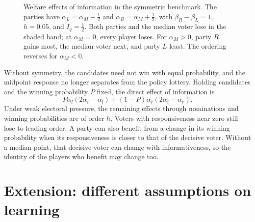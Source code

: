 \documentclass[12pt,letterpaper]{article}
\begin{document}
\begin{figure}[t]
\centering
{}
\caption{Welfare effects of information in the symmetric benchmark. The parties have $\alpha_L=\alpha_M-\tfrac12$ and $\alpha_R=\alpha_M+\tfrac12$, with $\beta_R-\beta_L=1$, $h=0.05$, and $I_q=\tfrac12$. Both parties and the median voter lose in the shaded band; at $\alpha_M=0$, every player loses. For $\alpha_M>0$, party $R$ gains most, the median voter next, and party $L$ least. The ordering reverses for $\alpha_M<0$.}
\label{fig:welfare}
\end{figure}

Without symmetry, the candidates need not win with equal probability, and the midpoint response no longer separates from the policy lottery. Holding candidates and the winning probability $P$ fixed, the direct effect of information is
\[
P\alpha_l(2\alpha_i-\alpha_l)+(1-P)\alpha_r(2\alpha_i-\alpha_r).
\]
Under weak electoral pressure, the remaining effects through nominations and winning probabilities are of order $h$. Voters with responsiveness near zero still lose to leading order. A party can also benefit from a change in its winning probability when its responsiveness is closer to that of the decisive voter. Without a median point, that decisive voter can change with informativeness, so the identity of the players who benefit may change too.

\section{Extension: different assumptions on learning}\label{sec:pre-election}
\end{document}
